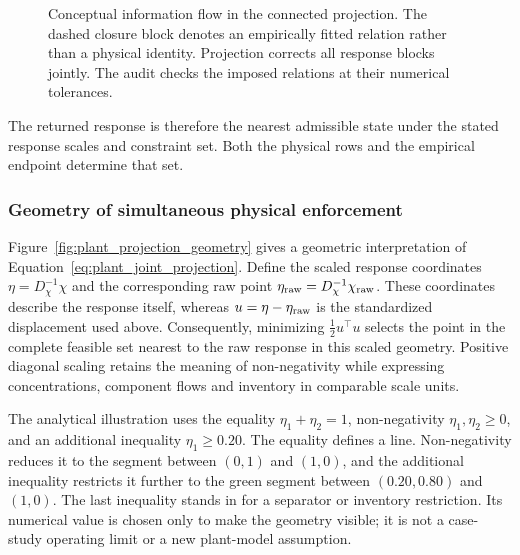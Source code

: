 \begin{figure}[htbp]
\caption{Conceptual information flow in the connected projection. The dashed closure block denotes an empirically fitted relation rather than a physical identity. Projection corrects all response blocks jointly. The audit checks the imposed relations at their numerical tolerances.}
\label{fig:plant_projection_architecture}
\end{figure}

The returned response is therefore the nearest admissible state under the stated response scales and constraint set. Both the physical rows and the empirical endpoint determine that set.

\subsubsection{Geometry of simultaneous physical enforcement}

Figure~\ref{fig:plant_projection_geometry} gives a geometric interpretation of Equation~\eqref{eq:plant_joint_projection}. Define the scaled response coordinates $\eta=D_\chi^{-1}\chi$ and the corresponding raw point $\eta_{\rm raw}=D_\chi^{-1}\chi_{\rm raw}$. These coordinates describe the response itself, whereas $u=\eta-\eta_{\rm raw}$ is the standardized displacement used above. Consequently, minimizing $\tfrac12u^\top u$ selects the point in the complete feasible set nearest to the raw response in this scaled geometry. Positive diagonal scaling retains the meaning of non-negativity while expressing concentrations, component flows and inventory in comparable scale units.

The analytical illustration uses the equality $\eta_1+\eta_2=1$, non-negativity $\eta_1,\eta_2\ge0$, and an additional inequality $\eta_1\ge0.20$. The equality defines a line. Non-negativity reduces it to the segment between $(0,1)$ and $(1,0)$, and the additional inequality restricts it further to the green segment between $(0.20,0.80)$ and $(1,0)$. The last inequality stands in for a separator or inventory restriction. Its numerical value is chosen only to make the geometry visible; it is not a case-study operating limit or a new plant-model assumption.

